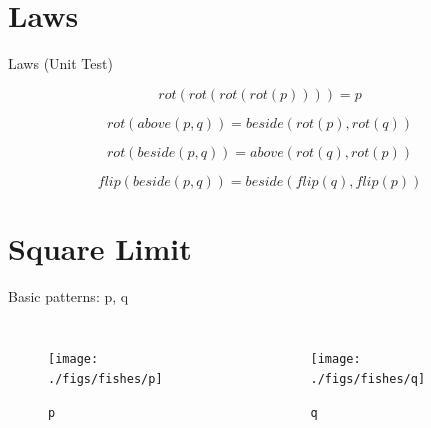 \documentclass{beamer}
\begin{document}
    \section{Laws}

    \begin{frame}{Laws (Unit Test)}

        \begin{equation*}
        rot(rot(rot(rot(p)))) = p
        \end{equation*}

        \begin{equation*}
        rot(above(p, q)) = beside(rot(p), rot(q))
        \end{equation*}

        \begin{equation*}
        rot(beside(p, q)) = above(rot(q), rot(p))
        \end{equation*}

        \begin{equation*}
        flip(beside(p, q)) = beside(flip(q), flip(p))
        \end{equation*}
    \end{frame}

    \section{Square Limit}

    \begin{frame}{Basic patterns: p, q}

        \begin{columns}[T,onlytextwidth]
                \begin{figure}
                    \centering
                    \texttt{[image: ./figs/fishes/p]}
                    \caption{\texttt{p}}
                    \label{fig:p}
                \end{figure}

                \begin{figure}
                    \centering
                    \texttt{[image: ./figs/fishes/q]}
                    \caption{\texttt{q}}
                    \label{fig:q}
                \end{figure}

        \end{columns}

    \end{frame}
\end{document}
